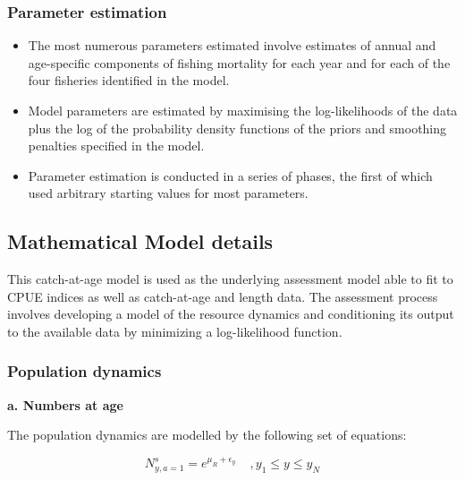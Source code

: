 \documentclass{article}
\begin{document}

\subsubsection{Parameter estimation}

\begin{itemize}

\item The most numerous parameters estimated involve estimates of annual and age-specific components of fishing mortality for each year and for each of the four fisheries identified in the model.

\item Model parameters are estimated by maximising the log-likelihoods of the data plus the log of the probability density functions of the priors and smoothing penalties specified in the model.

\item Parameter estimation is conducted in a series of phases, the first of which used arbitrary starting values for most parameters.

\end{itemize}

\subsection{Mathematical Model details}

This catch-at-age model is used as the underlying assessment model able to fit to CPUE indices as well as catch-at-age and length data. The assessment process involves developing a model of the resource dynamics and conditioning its output to the available data by minimizing a log-likelihood function.

\subsubsection{Population dynamics}

\textbf{a. Numbers at age}

The population dynamics are modelled by the following set of equations:

\begin{equation}
N^s_{y,a=1}=e^{\mu_R+\epsilon_{y}}  \ \ \ \ \ , y_{1}\leq y \leq y_{N}
\end{equation}
\end{document}
